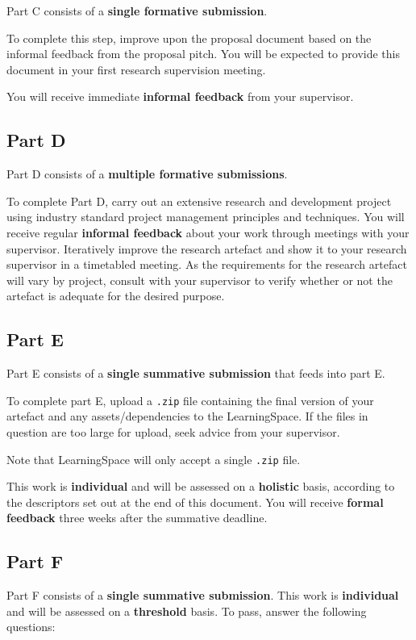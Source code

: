 Part C consists of a \textbf{single formative submission}.

To complete this step, improve upon the proposal document based on the informal feedback from the proposal pitch. You will be expected to provide this document in your first research supervision meeting. 

You will receive immediate \textbf{informal feedback} from your supervisor.

\subsection*{Part D}

Part D consists of a \textbf{multiple formative submissions}.

To complete Part D, carry out an extensive research and development project using industry standard project management principles and techniques. You will receive regular \textbf{informal feedback} about your work through meetings with your supervisor. Iteratively improve the research artefact and show it to your research supervisor in a timetabled meeting. As the requirements for the research artefact will vary by project, consult with your supervisor to verify whether or not the artefact is adequate for the desired purpose.

\subsection*{Part E}

Part E consists of a \textbf{single summative submission} that feeds into part E. 

To complete part E, upload a \texttt{.zip} file containing the final version of your artefact and any assets/dependencies to the LearningSpace. If the files in question are too large for upload, seek advice from your supervisor.

Note that LearningSpace will only accept a single \texttt{.zip} file.

This work is \textbf{individual} and will be assessed on a \textbf{holistic} basis, according to the descriptors set out at the end of this document. You will receive \textbf{formal feedback} three weeks after the summative deadline.

\subsection*{Part F}

Part F consists of a \textbf{single summative submission}.
This work is \textbf{individual} and will be assessed on a \textbf{threshold} basis.
To pass, answer the following questions:

